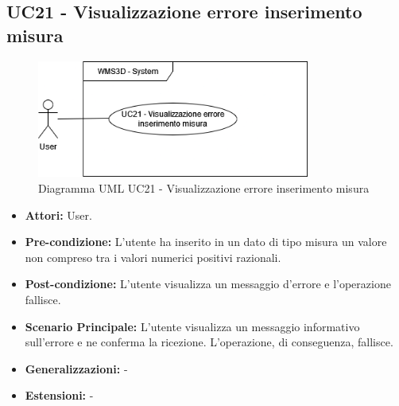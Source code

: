 \subsection{UC21 - Visualizzazione errore inserimento misura}
\begin{figure}[H]
  \centering
  \includegraphics[width=0.8\textwidth]{UC_diagrams_21-27/UC21.drawio.png}
   \caption{Diagramma UML UC21 - Visualizzazione errore inserimento misura}
\end{figure}
\begin{itemize}
    \item \textbf{Attori:} User.
    \item \textbf{Pre-condizione:}  L'utente ha inserito in un dato di tipo misura un valore non compreso tra i valori numerici positivi razionali.
    \item \textbf{Post-condizione:} L'utente visualizza un messaggio d'errore e l'operazione fallisce.
    \item \textbf{Scenario Principale:}  L'utente visualizza un messaggio informativo sull'errore e ne conferma la ricezione. L'operazione, di conseguenza, fallisce.
    \item \textbf{Generalizzazioni:} -
    \item \textbf{Estensioni:} -
\end{itemize}